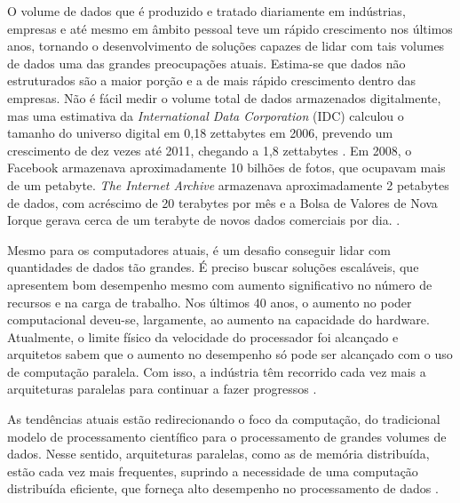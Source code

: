 
O volume de dados que é produzido e tratado diariamente em indústrias, empresas e até mesmo em âmbito pessoal teve um rápido crescimento nos últimos anos, tornando o desenvolvimento de soluções capazes de lidar com tais volumes de dados uma das grandes preocupações atuais. Estima-se que dados não estruturados são a maior porção e a de mais rápido crescimento dentro das empresas. 
Não é fácil medir o volume total de dados armazenados digitalmente, mas uma estimativa da \textit{International Data Corporation} (IDC) calculou o tamanho do universo digital em 0,18 zettabytes em 2006, prevendo um crescimento de dez vezes até 2011, chegando a 1,8 zettabytes \cite{Gantz:2008}.
Em 2008, o Facebook armazenava aproximadamente 10 bilhões de fotos, que ocupavam mais de um petabyte. \textit{The Internet Archive} armazenava aproximadamente 2 petabytes de dados, com acréscimo de 20 terabytes por mês e a Bolsa de Valores de Nova Iorque gerava cerca de um terabyte de novos dados comerciais por dia. 
\cite{White:2009}. %


Mesmo para os computadores atuais, é um desafio conseguir lidar com quantidades de dados tão grandes. É preciso buscar soluções escaláveis, que apresentem bom desempenho mesmo com aumento significativo no número de recursos e na carga de trabalho. 
Nos últimos 40 anos, o aumento no poder computacional deveu-se, largamente, ao aumento na capacidade do hardware. Atualmente, o limite físico da velocidade do processador foi alcançado e arquitetos sabem que o aumento no desempenho só pode ser alcançado com o uso de computação paralela. Com isso, a indústria têm recorrido cada vez mais a arquiteturas paralelas para continuar a fazer progressos \cite{Manferdelli:2008}. 

As tendências atuais estão redirecionando o foco da computação, do tradicional modelo de processamento científico para o processamento de grandes volumes de dados.
Nesse sentido, arquiteturas paralelas, como as de memória distribuída, estão cada vez mais frequentes, suprindo a necessidade de uma computação distribuída eficiente, que forneça alto desempenho no processamento de dados \cite{Bryant:2011}.


